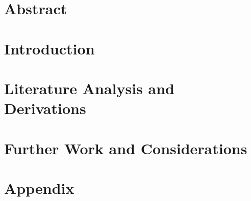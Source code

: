 \documentclass[aip,graphicx]{revtex4-1}
\begin{document}


\section{Abstract}


\section{Introduction}


% 

\section{Literature Analysis and Derivations}


\section{Further Work and Considerations}


\section{Appendix}




\end{document}
